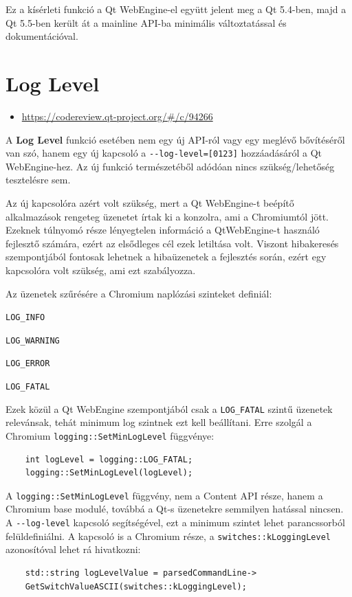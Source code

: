 \documentclass[12pt]{report}
\let\origurl\url
\renewcommand{\url}[1]{%
    \textcolor{blue}{\origurl{#1}}
}
\newcommand{\gerrit}[1]{%
    \textcolor{qtgreen}{\origurl{https://codereview.qt-project.org/\#/c/#1}}
}
\begin{document}
Ez a kísérleti funkció a Qt WebEngine-el együtt jelent meg a Qt 5.4-ben, majd a Qt 5.5-ben
került át a mainline API-ba minimális változtatással és dokumentációval.


\section{Log Level}

\begin{center}
    \begin{reviewbox}
        \begin{itemize}
            \renewcommand{\labelitemi}{\textcolor{qtgreen}{$\blacktriangleright$}}
            \item \gerrit{94266}
        \end{itemize}
    \end{reviewbox}
\end{center}

\noindent
A \textbf{Log Level} funkció esetében nem egy új API-ról vagy egy meglévő bővítéséről van
szó, hanem egy új kapcsoló a \texttt{-{}-log-level=[0123]} hozzáadásáról a Qt WebEngine-hez.
Az új funkció természetéből adódóan nincs szükség/lehetőség tesztelésre sem.

Az új kapcsolóra azért volt szükség, mert a Qt WebEngine-t beépítő alkalmazások rengeteg
üzenetet írtak ki a konzolra, ami a Chromiumtól jött. Ezeknek túlnyomó része lényegtelen
információ a QtWebEngine-t használó fejlesztő számára, ezért az elsődleges cél ezek
letiltása volt. Viszont hibakeresés szempontjából fontosak lehetnek a hibaüzenetek a
fejlesztés során, ezért egy kapcsolóra volt szükség, ami ezt szabályozza.

Az üzenetek szűrésére a Chromium naplózási szinteket definiál:
\begin{description}[
            labelsep=-0.5cm,
            itemsep=0cm,
            before={\renewcommand\makelabel[1]{\bfseries ##1}}]
    \item[0] \texttt{LOG\_INFO}
    \item[1] \texttt{LOG\_WARNING}
    \item[2] \texttt{LOG\_ERROR}
    \item[3] \texttt{LOG\_FATAL}
\end{description}
Ezek közül a Qt WebEngine szempontjából csak a \texttt{LOG\_FATAL} szintű üzenetek
relevánsak, tehát minimum log szintnek ezt kell beállítani.
Erre szolgál a Chromium \texttt{logging::SetMinLogLevel} függvénye:
\begin{verbatim}
    int logLevel = logging::LOG_FATAL;
    logging::SetMinLogLevel(logLevel);
\end{verbatim}
A \texttt{logging::SetMinLogLevel} függvény, nem a Content API része, hanem a Chromium base
modulé, továbbá a Qt-s üzenetekre semmilyen hatással nincsen. A \texttt{-{}-log-level}
kapcsoló segítségével, ezt a minimum szintet lehet parancssorból felüldefiniálni. A kapcsoló
is a Chromium része, a \texttt{switches::kLoggingLevel} azonosítóval lehet rá hivatkozni:
\begin{verbatim}
    std::string logLevelValue = parsedCommandLine->
    GetSwitchValueASCII(switches::kLoggingLevel);
\end{verbatim}
\end{document}
